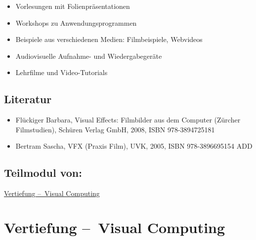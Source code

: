 \begin{itemize}
\tightlist
\item
  Vorlesungen mit Folienpräsentationen
\item
  Workshops zu Anwendungsprogrammen
\item
  Beispiele aus verschiedenen Medien: Filmbeispiele, Webvideos
\item
  Audiovisuelle Aufnahme- und Wiedergabegeräte
\item
  Lehrfilme und Video-Tutorials
\end{itemize}

\hypertarget{literaturpathlabelmi-2017modulbeschreibungen-bachelorba_vc-visuelle-effekte-und-animation}{%
\section*{Literatur\label{/mi-2017/modulbeschreibungen-bachelor/BA_VC-visuelle-effekte-und-animation}}\label{literaturpathlabelmi-2017modulbeschreibungen-bachelorba_vc-visuelle-effekte-und-animation}}

\begin{itemize}
\tightlist
\item
  Flückiger Barbara, Visual Effects: Filmbilder aus dem Computer
  (Zürcher Filmstudien), Schüren Verlag GmbH, 2008, ISBN 978-3894725181
\item
  Bertram Sascha, VFX (Praxis Film), UVK, 2005, ISBN 978-3896695154 ADD
\end{itemize}

\hypertarget{teilmodul-vonpathlabelmi-2017modulbeschreibungen-bachelorba_vc-visuelle-effekte-und-animation}{%
\section*{Teilmodul
von:\label{/mi-2017/modulbeschreibungen-bachelor/BA_VC-visuelle-effekte-und-animation}}\label{teilmodul-vonpathlabelmi-2017modulbeschreibungen-bachelorba_vc-visuelle-effekte-und-animation}}

\hyperref[/mi-2017/modulbeschreibungen-bachelor/BA_Vertiefung-Visual-Computing]{Vertiefung – Visual Computing}

\hypertarget{vertiefung-visual-computingpathlabelmi-2017modulbeschreibungen-bachelorba_vertiefung-visual-computing}{%
\chapter{Vertiefung --~Visual
Computing\label{/mi-2017/modulbeschreibungen-bachelor/BA_Vertiefung-Visual-Computing}}\label{vertiefung-visual-computingpathlabelmi-2017modulbeschreibungen-bachelorba_vertiefung-visual-computing}}

